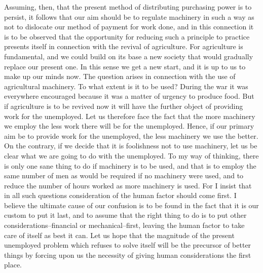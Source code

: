 \documentclass{book}
\begin{document}
Assuming, then, that the present method of distributing purchasing power is to persist, it follows that our aim should be to regulate machinery in such a way as not to dislocate our method of payment for work done, and in this connection it is to be observed that the opportunity for reducing such a principle to practice presents itself in connection with the revival of agriculture. For agriculture is fundamental, and we could build on its base a new society that would gradually replace our present one. In this sense we get a new start, and it is up to us to make up our minds now. The question arises in connection with the use of agricultural machinery. To what extent is it to be used? During the war it was everywhere encouraged because it was a matter of urgency to produce food. But if agriculture is to be revived now it will have the further object of providing work for the unemployed. Let us therefore face the fact that the more machinery we employ the less work there will be for the unemployed. Hence, if our primary aim be to provide work for the unemployed, the less machinery we use the better. On the contrary, if we decide that it is foolishness not to use machinery, let us be clear what we are going to do with the unemployed. To my way of thinking, there is only one sane thing to do if machinery is to be used, and that is to employ the same number of men as would be required if no machinery were used, and to reduce the number of hours worked as more machinery is used. For I insist that in all such questions consideration of the human factor should come first. I believe the ultimate cause of our confusion is to be found in the fact that it is our custom to put it last, and to assume that the right thing to do is to put other considerations–financial or mechanical–first, leaving the human factor to take care of itself as best it can. Let us hope that the magnitude of the present unemployed problem which refuses to solve itself will be the precursor of better things by forcing upon us the necessity of giving human considerations the first place.
\end{document}
